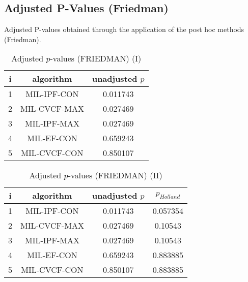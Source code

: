 \documentclass[a4paper,10pt]{article}
\begin{document}
\begin{landscape}
\newpage

\section{Adjusted P-Values (Friedman)}


Adjusted P-values obtained through the application of the post hoc methods (Friedman).

\begin{table}[!htp]
\centering\small
\begin{tabular}{ccc}
i&algorithm&unadjusted $p$\\
\hline1&MIL-IPF-CON&0.011743\\2&MIL-CVCF-MAX&0.027469\\3&MIL-IPF-MAX&0.027469\\4&MIL-EF-CON&0.659243\\5&MIL-CVCF-CON&0.850107\\\hline
\end{tabular}
\caption{Adjusted $p$-values (FRIEDMAN) (I)}
\end{table}
\begin{table}[!htp]
\centering\small
\begin{tabular}{cccc}
i&algorithm&unadjusted $p$&$p_{Holland}$\\
\hline1&MIL-IPF-CON&0.011743&0.057354\\2&MIL-CVCF-MAX&0.027469&0.10543\\3&MIL-IPF-MAX&0.027469&0.10543\\4&MIL-EF-CON&0.659243&0.883885\\5&MIL-CVCF-CON&0.850107&0.883885\\\hline
\end{tabular}
\caption{Adjusted $p$-values (FRIEDMAN) (II)}
\end{table}

\newpage
\end{landscape}
\end{document}
